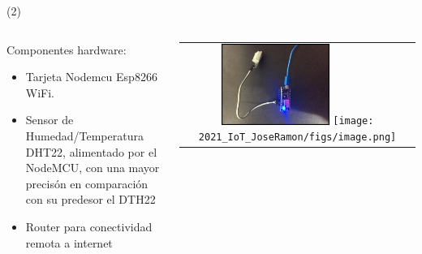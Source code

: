 \begin{frame}{ (2)}
\begin{columns}
\begin{column}{0.40\textwidth}
Componentes hardware:
\begin{itemize}
    \item Tarjeta Nodemcu Esp8266 WiFi. 
    \item Sensor de Humedad/Temperatura DHT22, alimentado por el NodeMCU, con una mayor precisón en comparación con su predesor el DTH22
    \item Router para conectividad remota a internet
	\end{itemize}
\end{column}
\begin{column}{0.60\textwidth}  
\begin{center}
     \begin{tabular}{c}
\includegraphics[width=0.48\textwidth]{2021_IoT_JoseRamon/figs/resultadodelsensor.jpg}
\texttt{[image: 2021\_IoT\_JoseRamon/figs/image.png]}\\
          \end{tabular}
\end{center}
\end{column} 
\end{columns} 
\end{frame}



